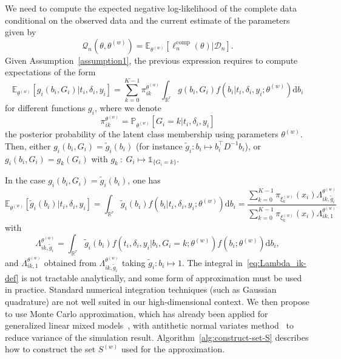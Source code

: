 \documentclass[11pt]{article}
\newcommand{\dd}{\mathrm{d}}
\newcommand{\ind}[1]{\mathds{1}_{#1}}
\newcommand{\cD}{\mathcal D}
\newcommand{\cQ}{\mathcal Q}
\newcommand{\R}{\mathds R}
\newcommand{\E}{\mathds E}
\renewcommand{\P}{\mathds P}
\begin{document}
We need to compute the expected negative log-likelihood of the complete data conditional on the observed data and the current estimate of the parameters given by 
\begin{equation*}
  \cQ_n(\theta, \theta^{(w)}) = \E_{\theta^{(w)}}[\ell_n^\text{comp}(\theta) | \cD_n].
\end{equation*}
Given Assumption~\ref{assumption1}, the previous expression requires to compute expectations of the form
\[ \E_{\theta^{(w)}}[ g_i(b_i, G_i) | t_i, \delta_i, y_i] = \sum_{k=0}^{K-1} \pi_{ik}^{\theta^{(w)}} \int_{\R^r} g(b_i, G_i) f(b_i | t_i, \delta_i, y_i ; \theta^{(w)}) \dd b_i \]
for different functions $g_i$, where we denote 
\begin{equation}
  \label{eq:pi_ik-def}
  \pi_{ik}^{\theta^{(w)}} = \P_{\theta^{(w)}}[G_i = k | t_i, \delta_i, y_i] 
\end{equation}
the posterior probability of the latent class membership using parameters $\theta^{(w)}$. 
Then, either $g_i(b_i, G_i) = \tilde g_i(b_i)$ (for instance $\tilde g_i: b_i \mapsto b_i^\top D^{-1}b_i$), or $g_i(b_i, G_i) = g_k(G_i)$ with $g_k~:~G_i \mapsto \ind{\{G_i=k\}}$.

In the case $g_i(b_i, G_i) = \tilde g_i(b_i)$, one has
\begin{equation}
  \label{eq:def-E-g-tilde}
  \E_{\theta^{(w)}}[ \tilde g_i(b_i) | t_i, \delta_i, y_i] = \int_{\R^r} \tilde g_i(b_i) f(b_i | t_i, \delta_i, y_i ; \theta^{(w)}) \dd b_i = \dfrac{ \sum_{k=0}^{K-1} \pi_{\xi_k^{(w)}}(x_i) \Lambda_{ik,\tilde g_i}^{\theta^{(w)}}}{\sum_{k=0}^{K-1} \pi_{\xi_k^{(w)}}(x_i) \Lambda_{ik,1}^{\theta^{(w)}}}
\end{equation}
with
\begin{equation}
  \label{eq:Lambda_ik-def}
  \Lambda_{ik,\tilde g_i}^{\theta^{(w)}} = \int_{\R^r} \tilde g_i(b_i) f(t_i, \delta_i, y_i | b_i, G_i = k ; \theta^{(w)}) f(b_i ; \theta^{(w)}) \dd b_i,
\end{equation}
and $\Lambda_{ik,1}^{\theta^{(w)}}$ obtained from $\Lambda_{ik,\tilde g_i}^{\theta^{(w)}}$ taking $\tilde g_i: b_i \mapsto 1$.
The integral in~\eqref{eq:Lambda_ik-def} is not tractable analytically, and some form of approximation must be used in practice. Standard numerical integration techniques (such as Gaussian quadrature) are not well suited in our high-dimensional context. We then propose to use Monte Carlo approximation, which has already been applied for generalized linear mixed models~\citep{booth1999maximizing}, with antithetic normal variates method~\citep{hammersley1956new} to reduce variance of the simulation result. Algorithm~\ref{alg:construct-set-S} describes how to construct the set $S^{(w)}$ used for the approximation.
\end{document}

